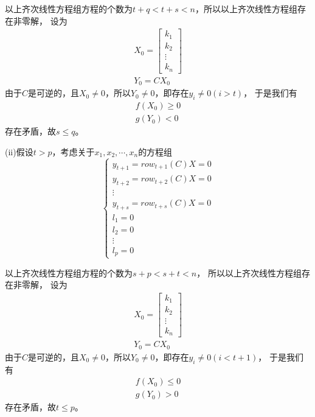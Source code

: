 \documentclass{article}
\begin{document}
以上齐次线性方程组方程的个数为$t + q < t + s < n$，所以以上齐次线性方程组存在非零解，
设为\begin{align*}
  X_0 = \begin{bmatrix}
          k_1    \\
          k_2    \\
          \vdots \\
          k_n
        \end{bmatrix} \\
  Y_0 = C X_0
\end{align*}
由于$C$是可逆的，且$X_0 \neq 0$，所以$Y_0 \neq 0$，即存在$y_i \neq 0 (i > t)$，
于是我们有
\begin{align*}
  f(X_0) \geq 0 \\
  g(Y_0) < 0
\end{align*}
存在矛盾，故$s \leq q$。

(ii)假设$t > p$，考虑关于$x_1, x_2, \cdots, x_n$的方程组
\begin{equation*}
  \begin{cases}
    y_{t+1} = row_{t + 1}(C) X = 0 \\
    y_{t+2} = row_{t + 2}(C) X = 0 \\
    \vdots                         \\
    y_{t+s} = row_{t + s}(C) X = 0 \\
    l_{1} = 0                      \\
    l_{2} = 0                      \\
    \vdots                         \\
    l_{p} = 0
  \end{cases}
\end{equation*}

以上齐次线性方程组方程的个数为$s + p < s + t < n$，
所以以上齐次线性方程组存在非零解，
设为\begin{align*}
  X_0 = \begin{bmatrix}
          k_1    \\
          k_2    \\
          \vdots \\
          k_n
        \end{bmatrix} \\
  Y_0 = C X_0
\end{align*}
由于$C$是可逆的，且$X_0 \neq 0$，所以$Y_0 \neq 0$，即存在$y_i \neq 0 (i < t+1)$，
于是我们有
\begin{align*}
  f(X_0) \leq 0 \\
  g(Y_0) > 0
\end{align*}
存在矛盾，故$t \leq p$。
\end{document}
